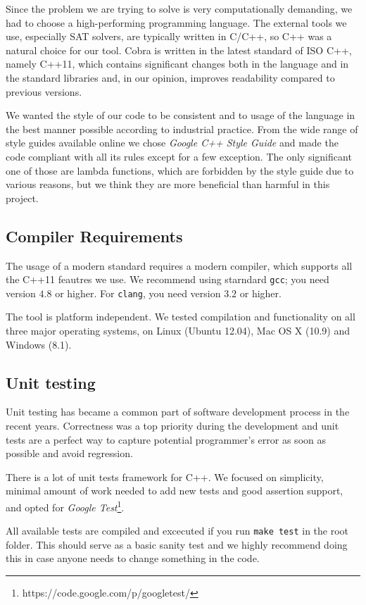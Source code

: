 Since the problem we are trying to solve is very computationally demanding,
  we had to choose a high-performing programming language.
The external tools we use, especially SAT solvers, are typically written in C/C++,
  so C++ was a natural choice for our tool.
Cobra is written in the latest standard of ISO C++, namely C++11, which
  contains significant changes both in the language and in the standard libraries
  and, in our opinion, improves readability compared to previous versions.

We wanted the style of our code to be consistent and to usage of the language in the best
 manner possible according to industrial practice.
From the wide range of style guides available online
 we chose \emph{Google C++ Style Guide}\cite{google-style} and made
 the code compliant with all its rules except for a few exception.
The only significant one of those are lambda functions, which are forbidden
 by the style guide due to various reasons,
 but we think they are more beneficial than harmful in this project.

\subsection{Compiler Requirements}
The usage of a modern standard requires a modern compiler,
  which supports all the C++11 feautres we use.
We recommend using starndard \texttt{gcc}; you need version $4.8$ or higher.
For \texttt{clang}, you need version $3.2$ or higher.

The tool is platform independent.
  We tested compilation and functionality on
  all three major operating systems, on Linux (Ubuntu 12.04),
  Mac OS X (10.9) and Windows (8.1).

\subsection{Unit testing}
Unit testing has became a common part of software development process
  in the recent years.
Correctness was a top priority during the development and
  unit tests are a perfect way to capture potential programmer's error
  as soon as possible and avoid regression.

There is a lot of unit tests framework for C++.
We focused on simplicity, minimal amount of work needed to add new tests
  and good assertion support, and opted for
  \emph{Google Test}\footnote{https://code.google.com/p/googletest/}.

All available tests are compiled and excecuted if you run \texttt{make test}
  in the root folder.
This should serve as a basic sanity test and we highly recommend
  doing this in case anyone needs to change something in the code.

